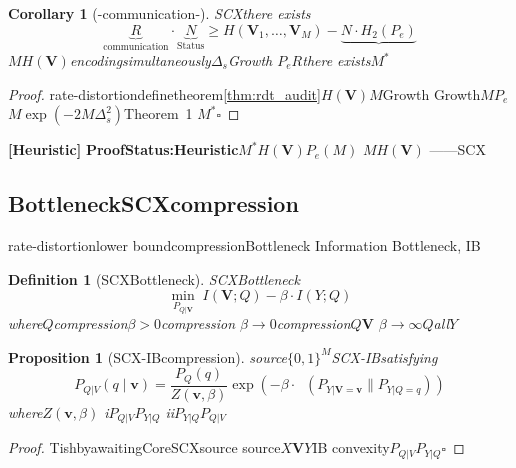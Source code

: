 \documentclass[11pt,a4paper]{article}
\newtheorem{proposition}[theorem]{Proposition}
\newtheorem{corollary}[theorem]{Corollary}
\newtheorem{definition}[theorem]{Definition}
\theoremstyle{remark}
\DeclareMathOperator{\KL}{D_{KL}}
\newcommand{\heuristic}{\textnormal{\textbf{[Heuristic]}}}
\begin{document}
\begin{corollary}[-communication-]
\label{cor:triad}
SCXthere exists
\begin{equation}
    \boxed{\underbrace{R}_{\text{communication}} \cdot \underbrace{N}_{\text{Status}}
    \geq H(\mathbf{V}_1, \ldots, \mathbf{V}_M) - \underbrace{N \cdot H_2(P_e)}_{\text{}}}
\end{equation}
$M$$H(\mathbf{V})$encodingsimultaneously$\Delta_s$Growth
$P_e$$R$there exists\textbf{}$M^*$
\end{corollary}

\begin{proof}
rate-distortiondefinetheorem\ref{thm:rdt_audit}$H(\mathbf{V})$$M$Growth
Growth$M$$P_e$$M$$\exp(-2M\Delta_s^2)$Theorem~1
$M^*$\hfill $\square$
\end{proof}

\heuristic{} \textbf{ProofStatus:Heuristic}$M^*$$H(\mathbf{V})$$P_e(M)$
$M$$H(\mathbf{V})$
——SCX

\subsection{BottleneckSCXcompression}

rate-distortionlower bound\textbf{}compressionBottleneck
Information Bottleneck, IB\cite{tishby2000ib}

\begin{definition}[SCXBottleneck]
\label{def:ib_scx}
SCXBottleneck
\begin{equation}
    \boxed{\min_{P_{Q|\mathbf{V}}} \; I(\mathbf{V}; Q) - \beta \cdot I(Y; Q)}
\end{equation}
where$Q$compression$\beta > 0$compression
$\beta \to 0$compression$Q$$\mathbf{V}$
$\beta \to \infty$$Q$all$Y$
\end{definition}

\begin{proposition}[SCX-IBcompression]
\label{prop:ib_structure}
source$\{0,1\}^M$SCX-IBsatisfying
\begin{equation}
    P_{Q|V}(q \mid \mathbf{v}) = \frac{P_Q(q)}{Z(\mathbf{v}, \beta)}
    \exp\!\left(-\beta \cdot \KL(P_{Y|\mathbf{V}=\mathbf{v}} \| P_{Y|Q=q})\right)
\end{equation}
where$Z(\mathbf{v}, \beta)$\textbf{}
i$P_{Q|V}$$P_{Y|Q}$
ii$P_{Y|Q}$$P_{Q|V}$
\end{proposition}

\begin{proof}
Tishbyawaiting\cite{tishby2000ib}CoreSCXsource
source$X$$\mathbf{V}$$Y$IB
convexity$P_{Q|V}$$P_{Y|Q}$\hfill $\square$
\end{proof}
\end{document}

